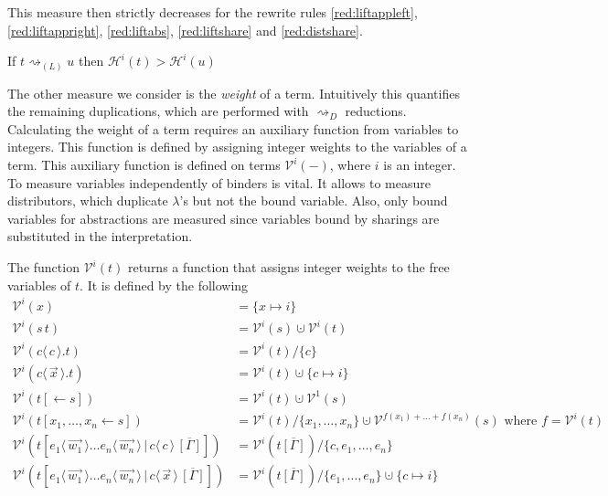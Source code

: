 \documentclass[a4paper,UKenglish,cleveref, autoref]{lipics-v2019}
\newcommand{\set}[1]{ \{ #1 \} }
\newcommand{\app}[2]{#1 \, #2}
\newcommand{\fake}[3]{#1 \langle \, #2 \, \rangle . #3}
\newcommand{\share}[3]{#1 [#2 \leftarrow #3]}
\newcommand{\dist}[5]{#1 [ #2 \, \vert \, \fakedist{#4}{#5} \, #3 ]}
\newcommand{\fakedist}[2]{#1 \langle \, #2 \, \rangle}
\newcommand{\height}[2]{\mathcal{H}^{#1}(#2)}
\newcommand{\weightvar}[2]{\mathcal{V}^{#1}(#2)}
\begin{document}
\noindent This measure then strictly decreases for the rewrite rules \ref{red:liftappleft}, \ref{red:liftappright}, \ref{red:liftabs}, \ref{red:liftshare} and \ref{red:distshare}.

\begin{lemma} 
\label{theo:liftingheight}
If $t \rightsquigarrow_{(L)} u$ then $\height{i}{t} > \height{i}{u}$
\end{lemma}

The other measure we consider is the \emph{weight} of a term. Intuitively this quantifies the remaining duplications, which are performed with $\rightsquigarrow_{D}$ reductions. Calculating the weight of a term requires an auxiliary function from variables to integers. This function is defined by assigning integer weights to the variables of a term. This auxiliary function is defined on terms $\weightvar{i}{-}$, where $i$ is an integer. To measure variables independently of binders is vital. It allows to measure distributors, which duplicate $\lambda$'s but not the bound variable. Also, only bound variables for abstractions are measured since variables bound by sharings are substituted in the interpretation.

\begin{definition}
The function $\weightvar{i}{t}$ returns a function that assigns integer weights to the free variables of $t$. It is defined by the following
\begin{align*}
	\weightvar{i}{x} &= \set{x \mapsto i} \\
	\weightvar{i}{\app{s}{t}} &= \weightvar{i}{s} \cupdot \weightvar{i}{t} \\
	\weightvar{i}{\fake{c}{c}{t}} &= \weightvar{i}{t} / \set{c} \\
	\weightvar{i}{\fake{c}{\vec{x}}{t}} &= \weightvar{i}{t} \cupdot \set{c \mapsto i} \\
	\weightvar{i}{\share{t}{}{s}} &= \weightvar{i}{t} \cupdot \weightvar{1}{s} \\
	\weightvar{i}{\share{t}{x_{1}, \dots, x_{n}}{s}} &= \weightvar{i}{t} / \set{x_{1}, \dots, x_{n}} \cupdot \weightvar{f(x_{1}) + \dots + f(x_{n})}{s} \text{ where } f = \weightvar{i}{t} \\
	\weightvar{i}{\dist{t}{\fakedist{e_{1}}{\vec{w_{1}}} \dots \fakedist{e_{n}}{\vec{w_{n}}}}{\overline{[\Gamma]}}{c}{c}} &= \weightvar{i}{t\overline{[\Gamma]}} / \set{c, e_{1}, \dots, e_{n}} \\
	\weightvar{i}{\dist{t}{\fakedist{e_{1}}{\vec{w_{1}}} \dots \fakedist{e_{n}}{\vec{w_{n}}}}{\overline{[\Gamma]}}{c}{\vec{x}}} &= \weightvar{i}{t\overline{[\Gamma]}} / \set{e_{1}, \dots, e_{n}} \cupdot \set{c \mapsto i}
\end{align*}
\end{definition}
\end{document}

